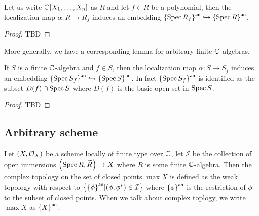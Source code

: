 \begin{lemma}
	Let us write $\mathbb{C}[X_{1},\dots,X_{n}]$ as $R$ and let $f \in R$ be a polynomial, then the localization map $\alpha : R \to R_{f}$ induces an embedding ${\left\{{\operatorname{Spec}{R_{f}}}\right\}}^{\mathsf{an}} \hookrightarrow {\left\{{\ensuremath{\operatorname{Spec}}{R}}\right\}}^{\mathsf{an}}$.
\end{lemma}
\begin{proof}
	TBD
\end{proof}

More generally, we have a corresponding lemma for arbitrary finite $\mathbb{C}$-algebras.

\begin{lemma}
	If $S$ is a finite $\mathbb{C}$-algebra and $f \in S$, then the localization map $\alpha : S \to S_{f}$ induces an embedding ${\left\{{\operatorname{Spec}{S_{f}}}\right\}}^{\mathsf{an}} \hookrightarrow {\left\{{\ensuremath{\operatorname{Spec}}{S}}\right\}}^{\mathsf{an}}$. In fact ${\left\{{\operatorname{Spec}{S_{f}}}\right\}}^{\mathsf{an}}$ is identified as the subset $D(f) \cap \operatorname{Spec}{S}$ where $D(f)$ is the basic open set in $\operatorname{Spec}{S}$.
\end{lemma}

\begin{proof}
	TBD
\end{proof}

\subsection{Arbitrary scheme}

\begin{definition}
	Let $\left(X, \mathcal{O}_{X}\right)$ be a scheme locally of finite type over $\mathbb{C}$, let $\mathcal{I}$ be the collection of open immersions $\left(\operatorname*{Spec}{R}, \widetilde{R}\right) \to X$ where $R$ is some finite $\mathbb{C}$-algebra. Then the complex topology on the set of closed points $\max X$ is defined as the weak topology with respect to $\left\{{\left\{{{\phi}}\right\}}^{\mathsf{an}} | (\phi, \phi^{*}) \in \mathcal{I}\right\}$ where ${\left\{{\phi}\right\}}^{\mathsf{an}}$ is the restriction of $\phi$ to the subset of closed points. When we talk about complex toplogy, we write $\max{X}$ as ${\left\{{X}\right\}}^{\mathsf{an}}$.
\end{definition}


